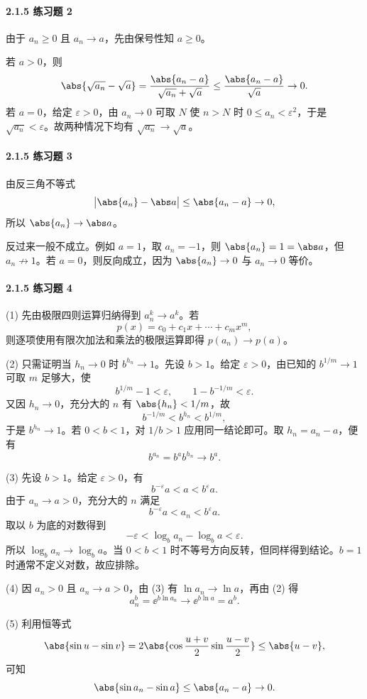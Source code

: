 \paragraph{2.1.5 练习题 2}
\begin{xsolution}
由于 $a_n\ge0$ 且 $a_n\to a$，先由保号性知 $a\ge0$。

若 $a>0$，则
\[
  \abs{\sqrt{a_n}-\sqrt a}
  =\frac{\abs{a_n-a}}{\sqrt{a_n}+\sqrt a}
  \le\frac{\abs{a_n-a}}{\sqrt a}\to0.
\]
若 $a=0$，给定 $\varepsilon>0$，由 $a_n\to0$ 可取 $N$ 使 $n>N$ 时 $0\le a_n<\varepsilon^2$，于是 $\sqrt{a_n}<\varepsilon$。故两种情况下均有 $\sqrt{a_n}\to\sqrt a$。
\end{xsolution}

\paragraph{2.1.5 练习题 3}
\begin{xsolution}
由反三角不等式
\[
  \bigl|\abs{a_n}-\abs a\bigr|\le\abs{a_n-a}\to0,
\]
所以 $\abs{a_n}\to\abs a$。

反过来一般不成立。例如 $a=1$，取 $a_n=-1$，则 $\abs{a_n}=1=\abs a$，但 $a_n\not\to1$。若 $a=0$，则反向成立，因为 $\abs{a_n}\to0$ 与 $a_n\to0$ 等价。
\end{xsolution}

\paragraph{2.1.5 练习题 4}
\begin{xsolution}
(1) 先由极限四则运算归纳得到 $a_n^k\to a^k$。若
\[
  p(x)=c_0+c_1x+\cdots+c_mx^m,
\]
则逐项使用有限次加法和乘法的极限运算即得 $p(a_n)\to p(a)$。

(2) 只需证明当 $h_n\to0$ 时 $b^{h_n}\to1$。先设 $b>1$。给定 $\varepsilon>0$，由已知的 $b^{1/m}\to1$ 可取 $m$ 足够大，使
\[
  b^{1/m}-1<\varepsilon,
  \qquad
  1-b^{-1/m}<\varepsilon.
\]
又因 $h_n\to0$，充分大的 $n$ 有 $\abs{h_n}<1/m$，故
\[
  b^{-1/m}<b^{h_n}<b^{1/m},
\]
于是 $b^{h_n}\to1$。若 $0<b<1$，对 $1/b>1$ 应用同一结论即可。取 $h_n=a_n-a$，便有
\[
  b^{a_n}=b^a b^{h_n}\to b^a.
\]

(3) 先设 $b>1$。给定 $\varepsilon>0$，有
\[
  b^{-\varepsilon}a<a<b^{\varepsilon}a.
\]
由于 $a_n\to a>0$，充分大的 $n$ 满足
\[
  b^{-\varepsilon}a<a_n<b^{\varepsilon}a.
\]
取以 $b$ 为底的对数得到
\[
  -\varepsilon<\log_ba_n-\log_ba<\varepsilon.
\]
所以 $\log_ba_n\to\log_ba$。当 $0<b<1$ 时不等号方向反转，但同样得到结论。$b=1$ 时通常不定义对数，故应排除。

(4) 因 $a_n>0$ 且 $a_n\to a>0$，由 (3) 有 $\ln a_n\to\ln a$，再由 (2) 得
\[
  a_n^b=\ee^{b\ln a_n}\to\ee^{b\ln a}=a^b.
\]

(5) 利用恒等式
\[
  \abs{\sin u-\sin v}
  =2\abs{\cos\frac{u+v}{2}\sin\frac{u-v}{2}}
  \le\abs{u-v},
\]
可知
\[
  \abs{\sin a_n-\sin a}\le\abs{a_n-a}\to0.
\]
\end{xsolution}

